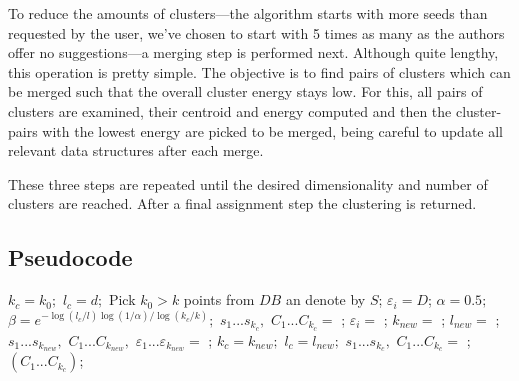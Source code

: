 \documentclass[english]{scrartcl}
\begin{document}
To reduce the amounts of clusters---the algorithm starts with more seeds than
requested by the user, we've chosen to start with 5 times as many as the
authors offer no suggestions---a merging step is performed next. Although quite
lengthy, this operation is pretty simple. The objective is to find pairs of
clusters which can be merged such that the overall cluster energy stays low.
For this, all pairs of clusters are examined, their centroid and energy
computed and then the cluster-pairs with the lowest energy are picked to be merged, being
careful to update all relevant data structures after each merge.

These three steps are repeated until the desired dimensionality and number of
clusters are reached. After a final assignment step the clustering is returned.

\subsection{Pseudocode}

\begin{algorithm}
\begin{algorithmic}
    \State $k_c = k_0;$ $l_c = d;$  
    \State Pick $k_0 > k$ points from $DB$ an denote by $S$;
        $\varepsilon_i = D$; 
    \EndFor
    \State $\alpha = 0.5;$ $\beta = e^{-\log (l_c/l)\log (1/\alpha) / \log (k_c/k)};$
        \State $s_1 ... s_{k_c},$ $C_1...C_{k_c} =$ ;
            $\varepsilon_i =$ ;
        \EndFor
        \State $k_{new} =$ ; $l_{new} =$ ;
        \State $s_1...s_{k_{new}},$ $C_1...C_{k_{new}},$ $\varepsilon_1...\varepsilon_{k_{new}} =$ ;
        \State $k_c = k_{new};$ $l_c = l_{new};$
    \EndWhile
    \State $s_1...s_{k_c},$ $C_1...C_{k_c} =$ ;
    \State \Return $(C_1...C_{k_c})$;
\EndFunction
\end{algorithmic}
\end{algorithm}
\end{document}

